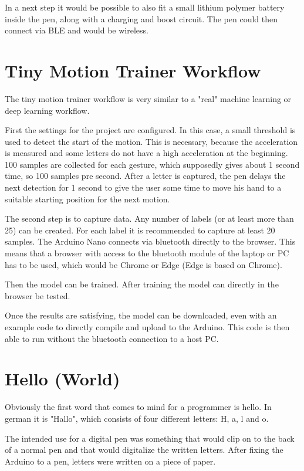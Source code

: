 \documentclass[a4paper,titlepage]{article}
\begin{document}
In a next step it would be possible to also fit a small lithium polymer battery inside the pen, along with a charging and boost circuit.
The pen could then connect via BLE and would be wireless.

\section{Tiny Motion Trainer Workflow}

The tiny motion trainer workflow is very similar to a "real" machine learning or deep learning workflow.

First the settings for the project are configured.
In this case, a small threshold is used to detect the start of the motion.
This is necessary, because the acceleration is measured and some letters do not have a high acceleration at the beginning.
100 samples are collected for each gesture, which supposedly gives about 1 second time, so 100 samples pre second.
After a letter is captured, the pen delays the next detection for 1 second to give the user some time to move his hand to a suitable starting position for the next motion.

The second step is to capture data.
Any number of labels (or at least more than 25) can be created.
For each label it is recommended to capture at least 20 samples.
The Arduino Nano connects via bluetooth directly to the browser.
This means that a browser with access to the bluetooth module of the laptop or PC has to be used, which would be Chrome or Edge (Edge is based on Chrome).

Then the model can be trained.
After training the model can directly in the browser be tested.

Once the results are satisfying, the model can be downloaded, even with an example code to directly compile and upload to the Arduino.
This code is then able to run without the bluetooth connection to a host PC.

\newpage
\section{Hello (World)}

Obviously the first word that comes to mind for a programmer is hello.
In german it is "Hallo", which consists of four different letters: H, a, l and o.

The intended use for a digital pen was something that would clip on to the back of a normal pen and that would digitalize the written letters.
After fixing the Arduino to a pen, letters were written on a piece of paper.
\end{document}
